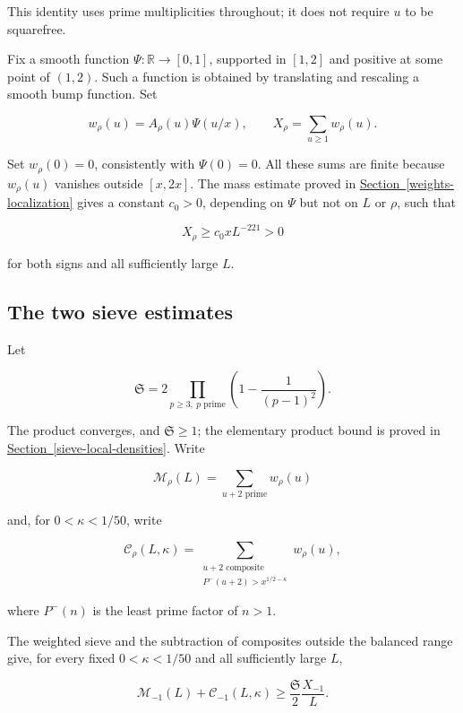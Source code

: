 This identity uses prime multiplicities throughout; it does not require
\(u\) to be squarefree.

Fix a smooth function \(\Psi:\mathbb R\to[0,1]\), supported in \([1,2]\)
and positive at some point of \((1,2)\). Such a function is obtained by
translating and rescaling a smooth bump function. Set

\[
w_\rho(u)=A_\rho(u)\Psi(u/x),\qquad
X_\rho=\sum_{u\ge1}w_\rho(u).
\]

Set \(w_\rho(0)=0\), consistently with \(\Psi(0)=0\). All these sums are
finite because \(w_\rho(u)\) vanishes outside \([x,2x]\). The mass
estimate proved in
\protect\hyperlink{weights-localization}{Section~\ref{weights-localization}}
gives a constant \(c_0>0\), depending on \(\Psi\) but not on \(L\) or
\(\rho\), such that

\[
X_\rho\ge c_0xL^{-221}>0 \tag{2}
\]

for both signs and all sufficiently large \(L\).


\hypertarget{proof-the-two-sieve-estimates}{%
\subsection{The two sieve
estimates}\label{proof-the-two-sieve-estimates}}

Let

\[
\mathfrak S=2\prod_{p\ge3,\ p\text{ prime}}
                  \left(1-\frac1{(p-1)^2}\right).
\]

The product converges, and \(\mathfrak S\ge1\); the elementary product
bound is proved in
\protect\hyperlink{sieve-local-densities}{Section~\ref{sieve-local-densities}}.
Write

\[
\mathcal M_\rho(L)=\sum_{u+2\text{ prime}}w_\rho(u)
\]

and, for \(0<\kappa<1/50\), write

\[
\mathcal C_\rho(L,\kappa)
 =\sum_{\substack{u+2\text{ composite}\\
                   P^-(u+2)>x^{1/2-\kappa}}}w_\rho(u),
\]

where \(P^-(n)\) is the least prime factor of \(n>1\).

The weighted sieve and the subtraction of composites outside the
balanced range give, for every fixed \(0<\kappa<1/50\) and all
sufficiently large \(L\),

\[
\mathcal M_{-1}(L)+\mathcal C_{-1}(L,\kappa)
 \ge\frac{\mathfrak S}{2}\frac{X_{-1}}L. \tag{3}
\]

